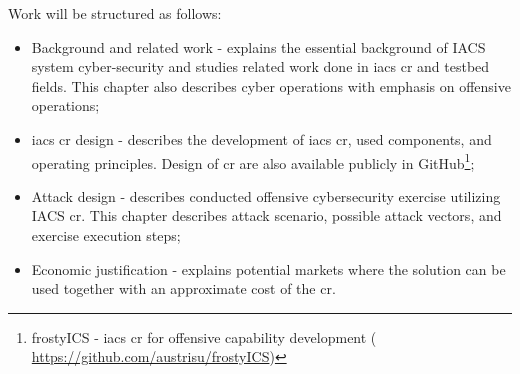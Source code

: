 Work will be structured as follows:  

\begin{itemize}
	\item Background and related work - explains the essential background of IACS system cyber-security and studies related work done in \gls*{iacs} \gls*{cr} and testbed fields. This chapter also describes cyber operations with emphasis on offensive operations;
	
	\item \gls*{iacs} \gls*{cr} design - describes the development of \gls*{iacs} \gls*{cr}, used components, and operating principles. Design of \gls*{cr} are also available publicly in GitHub\footnote{frostyICS - \gls*{iacs} \gls*{cr} for offensive capability development ( \href{https://github.com/austrisu/frostyICS}{https://github.com/austrisu/frostyICS})};
	
	\item Attack design - describes conducted offensive cybersecurity exercise utilizing IACS \gls*{cr}. This chapter describes attack scenario, possible attack vectors, and exercise execution steps;
	
	\item Economic justification - explains potential markets where the solution can be used together with an approximate cost of the \gls*{cr}.
\end{itemize}